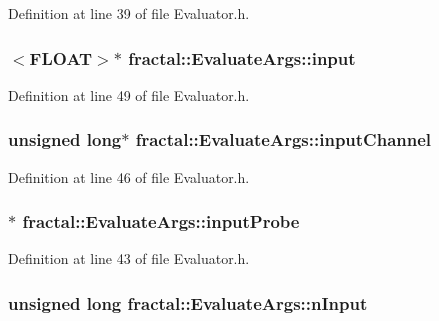 Definition at line 39 of file Evaluator.\+h.

\hypertarget{classfractal_1_1EvaluateArgs_a4a07d1045a8616deccf1329674dbdd2f}{
\subsubsection[{input}]{$<${\bf F\+L\+O\+A\+T}$>$$\ast$ fractal\+::\+Evaluate\+Args\+::input}}\label{classfractal_1_1EvaluateArgs_a4a07d1045a8616deccf1329674dbdd2f}


Definition at line 49 of file Evaluator.\+h.

\hypertarget{classfractal_1_1EvaluateArgs_a04e555137e4ae34be8c8e1d99c8a1fde}{
\subsubsection[{input\+Channel}]{\setlength{\rightskip}{0pt plus 5cm}unsigned long$\ast$ fractal\+::\+Evaluate\+Args\+::input\+Channel}}\label{classfractal_1_1EvaluateArgs_a04e555137e4ae34be8c8e1d99c8a1fde}


Definition at line 46 of file Evaluator.\+h.

\hypertarget{classfractal_1_1EvaluateArgs_a167edb46a0b2b2810369a8ac9ae16b34}{
\subsubsection[{input\+Probe}]{$\ast$ fractal\+::\+Evaluate\+Args\+::input\+Probe}}\label{classfractal_1_1EvaluateArgs_a167edb46a0b2b2810369a8ac9ae16b34}


Definition at line 43 of file Evaluator.\+h.

\hypertarget{classfractal_1_1EvaluateArgs_a4e30174710dd14fd17280950c0e56f01}{
\subsubsection[{n\+Input}]{\setlength{\rightskip}{0pt plus 5cm}unsigned long fractal\+::\+Evaluate\+Args\+::n\+Input}}\label{classfractal_1_1EvaluateArgs_a4e30174710dd14fd17280950c0e56f01}


